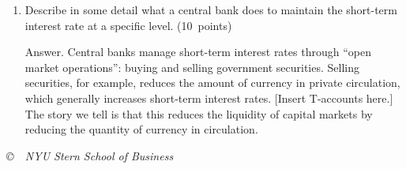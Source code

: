 \documentclass[letterpaper,12pt]{article}
\begin{document}
\begin{enumerate}
\begin{enumerate}
\item Describe in some detail what a central bank does to
maintain the short-term interest rate at a specific level.
(10~points)

Answer.  Central banks manage short-term interest rates through
``open market operations'': buying and selling government
securities. Selling securities, for example, reduces the amount of
currency in private circulation, which generally increases
short-term interest rates.  [Insert T-accounts here.] The story we
tell is that this reduces the liquidity of capital markets by
reducing the quantity of currency in circulation.

\end{enumerate}
\end{enumerate}



\vfill \centerline{\it \copyright \ \number\year \
NYU Stern School of Business}
\end{document}
